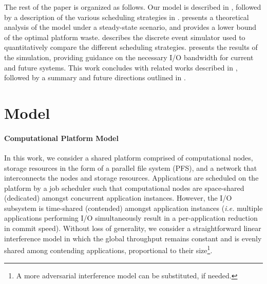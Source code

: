 \documentclass[two]{article}
\newcommand{\ie}[0]{\emph{i.e.}\xspace}
\begin{document}
The rest of the paper is organized as follows. Our model is described in
, followed by a description of the various scheduling
strategies in .  presents a
theoretical analysis of the model under a steady-state scenario, and provides a
lower bound of the optimal platform waste.  describes the
discrete event simulator used to quantitatively compare the different
scheduling strategies.   presents the results of the
simulation, providing guidance on the necessary I/O bandwidth for  current and
future systems. This work concludes with related works described in ,
followed by a summary and future directions outlined in .



%

\section{Model}
\label{sec:model}

\paragraph*{Computational Platform Model}

In this work, we consider a shared platform comprised of computational
nodes, storage resources in the form of a parallel file system (PFS), and a network
that interconnects the nodes and storage resources. Applications are
scheduled on the platform by a job scheduler such that computational nodes are
space-shared (dedicated) amongst concurrent application instances. However, the I/O
subsystem is time-shared (contended) amongst application instances  (\ie multiple
applications performing I/O simultaneously result in a per-application reduction
in commit speed). Without loss of generality, we consider a straightforward linear
interference model in which the global throughput remains constant and is evenly
shared among contending applications, proportional to their size\footnote{A more
adversarial interference model can be substituted, if needed.}.
\end{document}
